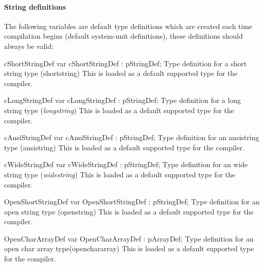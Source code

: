 \documentclass [12pt]{article}
\begin{document}
\paragraph{String definitions}
The following variables are default type definitions which are created each
time compilation begins (default system-unit definitions), these definitions
should always be valid:

\begin{variable}{cShortStringDef}
\Declaration 
var cShortStringDef : pStringDef; 
\Description 
Type definition for a short string type (\textsf{shortstring})
\Notes 
This is loaded as a default supported type for the compiler.
\end{variable}

\begin{variable}{cLongStringDef}
\Declaration
var cLongStringDef : pStringDef;
\Description
Type definition for a long string type (\textsf{\textit{longstring}}) 
\Notes
This is loaded as a default supported type for the compiler.
\end{variable}

\begin{variable}{cAnsiStringDef}
\Declaration 
var cAnsiStringDef : pStringDef; 
\Description 
Type definition for an ansistring type (\textsf{ansistring})
\Notes 
This is loaded as a default supported type for the compiler.
\end{variable}

\begin{variable}{cWideStringDef}
\Declaration
var cWideStringDef : pStringDef;
\Description
Type definition for an wide string type (\textsf{\textit{widestring}}) 
\Notes
This is loaded as a default supported type for the compiler.
\end{variable}

\begin{variable}{OpenShortStringDef}
\Declaration 
var OpenShortStringDef : pStringDef; 
\Description 
Type definition for an open string type (\textsf{openstring})
\Notes 
This is loaded as a default supported type for the compiler.
\end{variable}

\begin{variable}{OpenCharArrayDef}
\Declaration 
var OpenCharArrayDef : pArrayDef; 
\Description 
Type definition for an open char array type(\textsf{openchararray}) 
\Notes
This is loaded as a default supported type for the compiler.
\end{variable}
\end{document}
